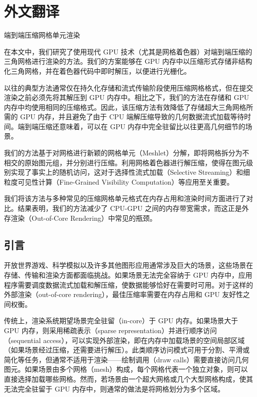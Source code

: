 \cleardoublepage

\newrefsection

\chapter{外文翻译}

\begin{center}
     端到端压缩网格单元渲染
\end{center}

\vspace{2em}


在本文中，我们研究了使用现代 GPU 技术（尤其是网格着色器）对端到端压缩的三角网格进行渲染的方法。我们的方案能够在 GPU 内存中以压缩形式存储非结构化三角网格，并在着色器代码中即时解压，以便进行光栅化。

以往的典型方法通常仅在持久化存储和流式传输阶段使用压缩网格格式，但在提交渲染之前必须先将其解压到 GPU 内存中。相比之下，我们的方法在存储和 GPU 内存中均使用相同的压缩格式。因此，该压缩方法有效降低了存储超大三角网格所需的 GPU 内存，并且避免了由于 CPU 端解压缩导致的几何数据流式加载等待时间。端到端压缩还意味着，可以在 GPU 内存中完全驻留比以往更高几何细节的场景。

我们的方法基于对网格进行新颖的网格单元（Meshlet）分解，即将网格拆分为不相交的原始图元组，并分别进行压缩。利用网格着色器进行解压缩，使得在图元级别实现了事实上的随机访问，这对于选择性流式加载（Selective Streaming）和细粒度可见性计算（Fine-Grained Visibility Computation）等应用至关重要。

我们将该方法与多种常见的压缩网格单元格式在内存占用和渲染时间方面进行了对比。结果表明，我们的方法减少了 CPU-GPU 之间的内存带宽需求，而这正是外存渲染（Out-of-Core Rendering）中常见的瓶颈。

\section{引言}

开放世界游戏、科学模拟以及许多其他图形应用通常涉及巨大的场景，这些场景在存储、传输和渲染方面都面临挑战。如果场景无法完全容纳于 GPU 内存中，应用程序需要调度数据流式加载和解压缩，使数据能够恰好在需要时可用。对于这样的外部渲染（out-of-core rendering），最佳压缩率需要在内存占用和 GPU 友好性之间权衡。

传统上，渲染系统期望场景完全驻留（in-core）于 GPU 内存。如果场景大于 GPU 内存，则采用稀疏表示（sparse representation）并进行顺序访问（sequential access），可以实现外部渲染，即在内存中加载场景的空间局部区域（如果场景经过压缩，还需要进行解压）。此类顺序访问模式可用于分割、平滑或简化等任务，但通常不适用于渲染——绘制调用（draw calls）需要直接访问几何图元。如果场景由多个网格（mesh）构成，每个网格代表一个独立对象，则可以直接选择加载哪些网格。然而，若场景由一个超大网格或几个大型网格构成，使其无法完全驻留于 GPU 内存中，则通常的做法是将网格划分为多个区域。

